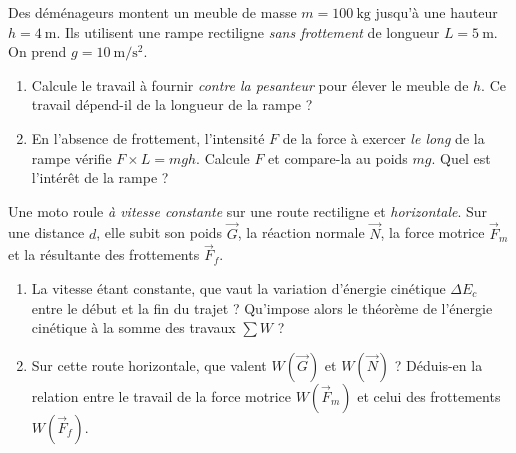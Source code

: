 \documentclass[11pt,a4paper]{article}
\newcommand{\vv}[1]{\vec{#1}}\newcommand{\ds}{\displaystyle}
\begin{document}
\begin{exo}
Des déménageurs montent un meuble de masse $m=\qty{100}{\kilogram}$ jusqu'à une hauteur
$h=\qty{4}{\metre}$. Ils utilisent une rampe rectiligne \emph{sans frottement} de longueur
$L=\qty{5}{\metre}$. On prend $g=\qty{10}{\metre\per\second\squared}$.
\begin{center}
\end{center}
\begin{enumerate}[label=\alph*)]
  \item Calcule le travail à fournir \emph{contre la pesanteur} pour élever le meuble de $h$.
        Ce travail dépend-il de la longueur de la rampe ?
  \item En l'absence de frottement, l'intensité $F$ de la force à exercer \emph{le long} de la rampe
        vérifie $F\times L=mgh$. Calcule $F$ et compare-la au poids $mg$. Quel est l'intérêt de la rampe ?
\end{enumerate}
\end{exo}

\begin{exo}
Une moto roule \emph{à vitesse constante} sur une route rectiligne et \emph{horizontale}. Sur une
distance $d$, elle subit son poids $\vv G$, la réaction normale $\vv N$, la force motrice $\vv F_m$ et
la résultante des frottements $\vv F_f$.
\begin{enumerate}[label=\alph*)]
  \item La vitesse étant constante, que vaut la variation d'énergie cinétique $\Delta E_c$ entre le
        début et la fin du trajet ? Qu'impose alors le théorème de l'énergie cinétique à la somme des
        travaux $\sum W$ ?
  \item Sur cette route horizontale, que valent $W(\vv G)$ et $W(\vv N)$ ? Déduis-en la relation entre
        le travail de la force motrice $W(\vv F_m)$ et celui des frottements $W(\vv F_f)$.
\end{enumerate}
\end{exo}
\end{document}
